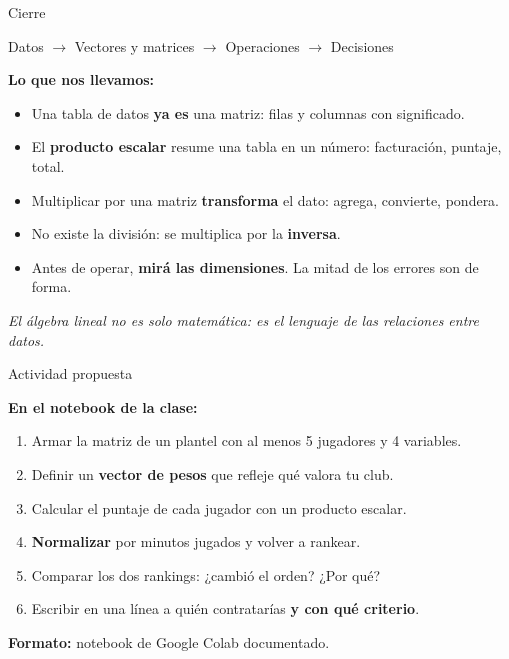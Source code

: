 \documentclass[aspectratio=169,10pt]{beamer}
\begin{document}
\begin{frame}{Cierre}

\vspace{0.5cm}
\begin{center}
\Large
Datos $\longrightarrow$ Vectores y matrices $\longrightarrow$ Operaciones $\longrightarrow$ Decisiones
\end{center}

\vspace{0.7cm}
\textbf{Lo que nos llevamos:}
\begin{itemize}
    \item Una tabla de datos \textbf{ya es} una matriz: filas y columnas con significado.
    \item El \textbf{producto escalar} resume una tabla en un número: facturación, puntaje, total.
    \item Multiplicar por una matriz \textbf{transforma} el dato: agrega, convierte, pondera.
    \item No existe la división: se multiplica por la \textbf{inversa}.
    \item Antes de operar, \textbf{mirá las dimensiones}. La mitad de los errores son de forma.
\end{itemize}

\vspace{0.5cm}
\begin{center}
\textit{El álgebra lineal no es solo matemática: es el lenguaje de las relaciones entre datos.}
\end{center}
\end{frame}

\begin{frame}{Actividad propuesta}

\textbf{En el notebook de la clase:}

\begin{enumerate}
    \item Armar la matriz de un plantel con al menos 5 jugadores y 4 variables.
    \item Definir un \textbf{vector de pesos} que refleje qué valora tu club.
    \item Calcular el puntaje de cada jugador con un producto escalar.
    \item \textbf{Normalizar} por minutos jugados y volver a rankear.
    \item Comparar los dos rankings: ¿cambió el orden? ¿Por qué?
    \item Escribir en una línea a quién contratarías \textbf{y con qué criterio}.
\end{enumerate}

\vspace{0.4cm}
\begin{center}
\textbf{Formato:} notebook de Google Colab documentado.
\end{center}
\end{frame}
\end{document}
